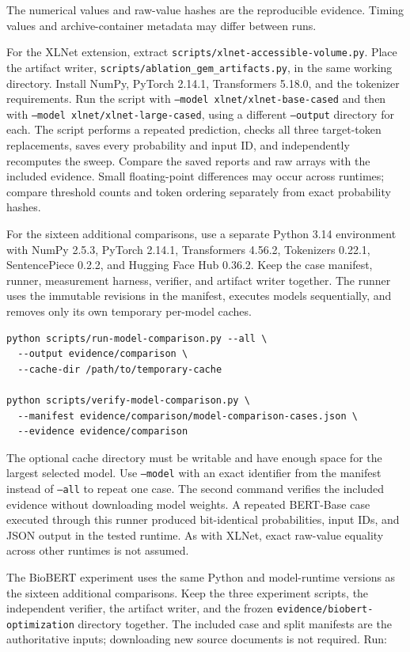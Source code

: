 \documentclass[11pt,a4paper]{article}
\begin{document}
The numerical values and raw-value hashes are the reproducible evidence. Timing values and archive-container metadata may differ between runs.

For the XLNet extension, extract \texttt{scripts/xlnet-accessible-volume.py}. Place the artifact writer, \texttt{scripts/ablation\_gem\_artifacts.py}, in the same working directory. Install NumPy, PyTorch 2.14.1, Transformers 5.18.0, and the tokenizer requirements. Run the script with \texttt{--model xlnet/xlnet-base-cased} and then with \texttt{--model xlnet/xlnet-large-cased}, using a different \texttt{--output} directory for each. The script performs a repeated prediction, checks all three target-token replacements, saves every probability and input ID, and independently recomputes the sweep. Compare the saved reports and raw arrays with the included evidence. Small floating-point differences may occur across runtimes; compare threshold counts and token ordering separately from exact probability hashes.

For the sixteen additional comparisons, use a separate Python 3.14 environment with NumPy 2.5.3, PyTorch 2.14.1, Transformers 4.56.2, Tokenizers 0.22.1, SentencePiece 0.2.2, and Hugging Face Hub 0.36.2. Keep the case manifest, runner, measurement harness, verifier, and artifact writer together. The runner uses the immutable revisions in the manifest, executes models sequentially, and removes only its own temporary per-model caches.

\begin{lstlisting}
python scripts/run-model-comparison.py --all \
  --output evidence/comparison \
  --cache-dir /path/to/temporary-cache

python scripts/verify-model-comparison.py \
  --manifest evidence/comparison/model-comparison-cases.json \
  --evidence evidence/comparison
\end{lstlisting}

The optional cache directory must be writable and have enough space for the largest selected model. Use \texttt{--model} with an exact identifier from the manifest instead of \texttt{--all} to repeat one case. The second command verifies the included evidence without downloading model weights. A repeated BERT-Base case executed through this runner produced bit-identical probabilities, input IDs, and JSON output in the tested runtime. As with XLNet, exact raw-value equality across other runtimes is not assumed.

The BioBERT experiment uses the same Python and model-runtime versions as the sixteen additional comparisons. Keep the three experiment scripts, the independent verifier, the artifact writer, and the frozen \texttt{evidence/biobert-optimization} directory together. The included case and split manifests are the authoritative inputs; downloading new source documents is not required. Run:
\end{document}

